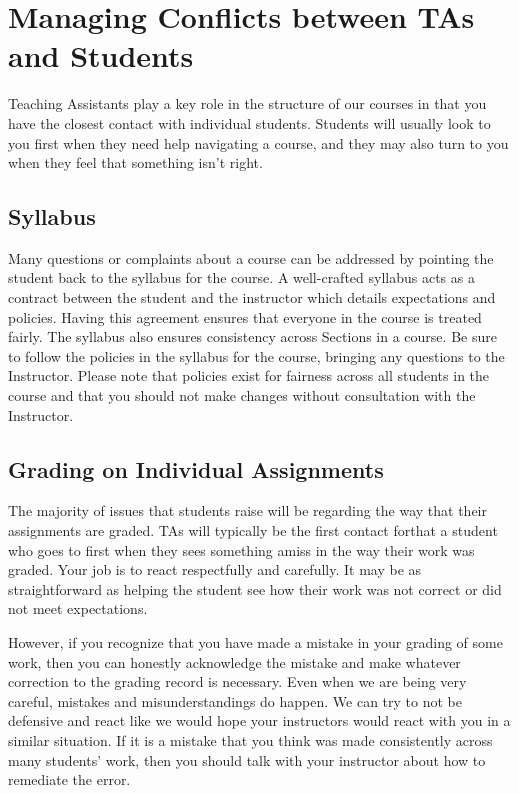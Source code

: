 \documentclass[
  letterpaper,
  DIV=11,
  numbers=noendperiod]{scrreprt}
\begin{document}
\hypertarget{managing-conflicts-between-tas-and-students}{%
\chapter{Managing Conflicts between TAs and
Students}\label{managing-conflicts-between-tas-and-students}}

Teaching Assistants play a key role in the structure of our courses in
that you have the closest contact with individual students. Students
will usually look to you first when they need help navigating a course,
and they may also turn to you when they feel that something isn't right.

\hypertarget{syllabus}{%
\section{Syllabus}\label{syllabus}}

Many questions or complaints about a course can be addressed by pointing
the student back to the syllabus for the course. A well-crafted syllabus
acts as a contract between the student and the instructor which details
expectations and policies. Having this agreement ensures that everyone
in the course is treated fairly. The syllabus also ensures consistency
across Sections in a course. Be sure to follow the policies in the
syllabus for the course, bringing any questions to the Instructor.
Please note that policies exist for fairness across all students in the
course and that you should not make changes without consultation with
the Instructor.

\hypertarget{grading-on-individual-assignments}{%
\section{Grading on Individual
Assignments}\label{grading-on-individual-assignments}}

The majority of issues that students raise will be regarding the way
that their assignments are graded. TAs will typically be the first
contact forthat a student who goes to first when they sees something
amiss in the way their work was graded. Your job is to react
respectfully and carefully. It may be as straightforward as helping the
student see how their work was not correct or did not meet expectations.

However, if you recognize that you have made a mistake in your grading
of some work, then you can honestly acknowledge the mistake and make
whatever correction to the grading record is necessary. Even when we are
being very careful, mistakes and misunderstandings do happen. We can try
to not be defensive and react like we would hope your instructors would
react with you in a similar situation. If it is a mistake that you think
was made consistently across many students' work, then you should talk
with your instructor about how to remediate the error.
\end{document}
